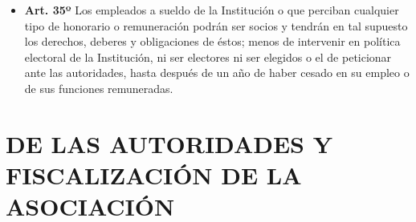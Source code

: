 \documentclass[openany]{book}
\providecommand{\tightlist}{%
  \setlength{\itemsep}{0pt}\setlength{\parskip}{0pt}}
\begin{document}
\begin{itemize}
\tightlist
\item
  \textbf{Art. 35º}
  Los empleados a sueldo de la Institución o que perciban cualquier tipo de honorario o remuneración podrán ser socios y tendrán en tal supuesto los derechos, deberes y obligaciones de éstos; menos de intervenir en política electoral de la Institución, ni ser electores ni ser elegidos o el de peticionar ante las autoridades, hasta después de un año de haber cesado en su empleo o de sus funciones remuneradas.
\end{itemize}

\hypertarget{cap5}{%
\chapter{DE LAS AUTORIDADES Y FISCALIZACIÓN DE LA ASOCIACIÓN}\label{cap5}}
\end{document}
